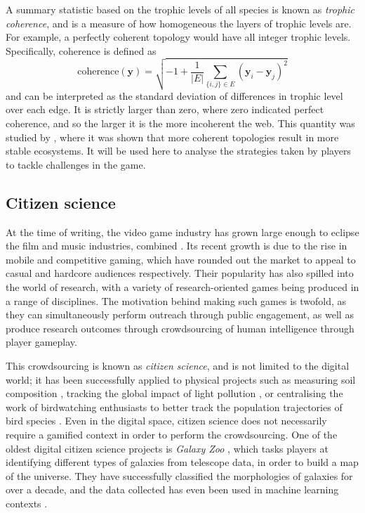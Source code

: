 A summary statistic based on the trophic levels of all species is known as \emph{trophic coherence}, and is a measure of how homogeneous the layers of trophic levels are. For example, a perfectly coherent topology would have all integer trophic levels. Specifically, coherence is defined as
\begin{equation}
  \mathrm{coherence}(\mathbf{y}) = \sqrt{ -1 + \frac{1}{|E|}\sum_{\{i,j\}\in E}(\mathbf{y}_i - \mathbf{y}_j)^2}
  \label{eq:coherence}
\end{equation}
and can be interpreted as the standard deviation of differences in trophic level over each edge. It is strictly larger than zero, where zero indicated perfect coherence, and so the larger it is the more incoherent the web.
This quantity was studied by \citet{Johnson2014}, where it was shown that more coherent topologies result in more stable ecosystems. It will be used here to analyse the strategies taken by players to tackle challenges in the game.

\subsection{Citizen science}
\label{sec:citizen_science}
At the time of writing, the video game industry has grown large enough to eclipse the film and music industries, combined \citep{Egenfeldt-Nielsen2019}. Its recent growth is due to the rise in mobile and competitive gaming, which have rounded out the market to appeal to casual and hardcore audiences respectively.
Their popularity has also spilled into the world of research, with a variety of research-oriented games being produced in a range of disciplines. The motivation behind making such games is twofold, as they can simultaneously perform outreach through public engagement, as well as produce research outcomes through crowdsourcing of human intelligence through player gameplay.

This crowdsourcing is known as \emph{citizen science}, and is not limited to the digital world; it has been successfully applied to physical projects such as measuring soil composition \citep{Rossiter2015}, tracking the global impact of light pollution \citep{Cui2020}, or centralising the work of birdwatching enthusiasts to better track the population trajectories of bird species \citep{Link2008}.
Even in the digital space, citizen science does not necessarily require a gamified context in order to perform the crowdsourcing. One of the oldest digital citizen science projects is \emph{Galaxy Zoo} \citep{Masters2019}, which tasks players at identifying different types of galaxies from telescope data, in order to build a map of the universe. They have successfully classified the morphologies of galaxies for over a decade, and the data collected has even been used in machine learning contexts \citep{Walmsley2020}.


